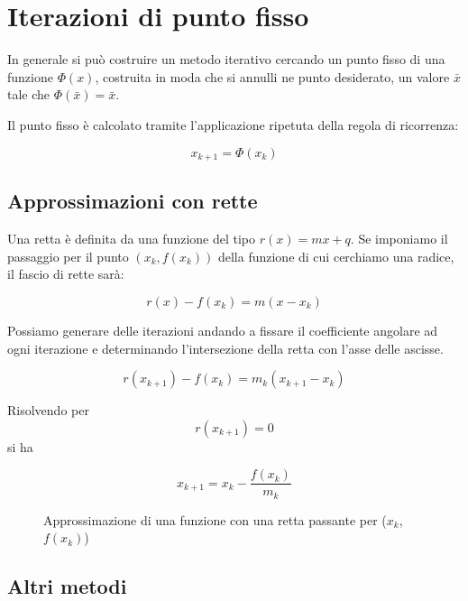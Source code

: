 \documentclass[12pt]{article}
\theoremstyle{plain}%
\theoremstyle{definition}
\theoremstyle{remark}
\begin{document}



\section{Iterazioni di punto fisso}

In generale si può costruire un metodo iterativo cercando un punto fisso di una funzione $\Phi(x)$,
costruita in moda che si annulli ne punto desiderato, un valore $\bar{x}$ tale che $\Phi(\bar{x}) = \bar{x}$.

Il punto fisso è calcolato tramite l'applicazione ripetuta della regola di ricorrenza:

$$x_{k+1} = \Phi(x_k)$$

\subsection{Approssimazioni con rette}

Una retta è definita da una funzione del tipo $r(x) = m x + q$.
Se imponiamo il passaggio per il punto $(x_k, f(x_k))$ della funzione di cui cerchiamo una radice, il fascio di rette sarà:

$$r(x) - f(x_k) = m (x - x_k)$$

Possiamo generare delle iterazioni andando a fissare il coefficiente angolare ad ogni iterazione e determinando l'intersezione della retta con l'asse delle ascisse.

$$r(x_{k+1}) - f(x_k) = m_k (x_{k+1} - x_k)$$

Risolvendo per $$r(x_{k+1}) = 0$$ si ha

\begin{equation}
    x_{k+1} = x_k - \frac{f(x_k)}{m_k}
\end{equation}

\begin{figure}
    \begin{center}
        
        \caption{Approssimazione di una funzione con una retta passante per ($x_k$, $f(x_k)$)}
        \label{fig:retta_approx}
    \end{center}
\end{figure}







\subsection{Altri metodi}
\end{document}
